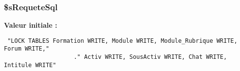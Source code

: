 \subsubsection{\setlength{\rightskip}{0pt plus 5cm}\$sRequeteSql}\label{copie__activ_8php_7fd44c997b9477ef9cf33ccb4eb5545e}


\textbf{Valeur initiale :}

\begin{Code}\begin{verbatim} "LOCK TABLES Formation WRITE, Module WRITE, Module_Rubrique WRITE, Forum WRITE,"
                    ." Activ WRITE, SousActiv WRITE, Chat WRITE, Intitule WRITE"
\end{verbatim}
\end{Code}

